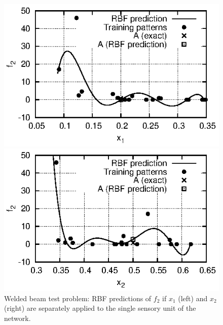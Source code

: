 \begin{figure}
\begin{minipage}{0.48\textwidth}
\includegraphics[scale=1.2]{IPE/f2_x1.eps}
\end{minipage}
\begin{minipage}{0.48\textwidth}
\includegraphics[scale=1.2]{IPE/f2_x2.eps}
\end{minipage}
\caption{Welded beam test problem: RBF predictions of $f_2$ if $x_1$ (left) and $x_2$ (right) are separately applied to the single sensory unit of the network. }
\label{fig:f2x1x2}
\end{figure}

